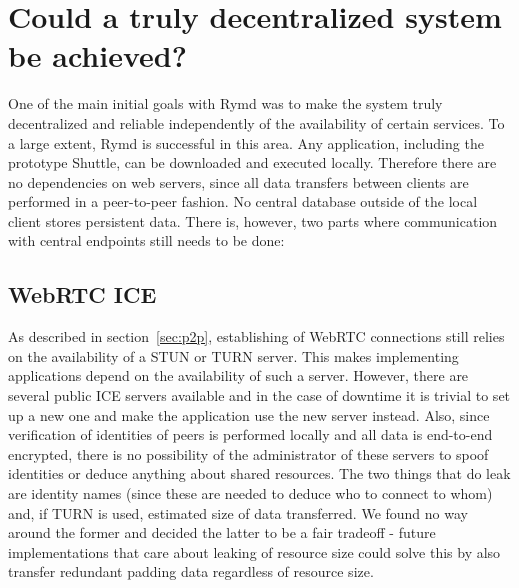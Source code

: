 \section{Could a truly decentralized system be achieved?}
One of the main initial goals with Rymd was to make the system truly decentralized and reliable independently of the availability of certain services. To a large extent, Rymd is successful in this area. Any application, including the prototype Shuttle, can be downloaded and executed locally. Therefore there are no dependencies on web servers, since all data transfers between clients are performed in a peer-to-peer fashion. No central database outside of the local client stores persistent data. There is, however, two parts where communication with central endpoints still needs to be done:

\subsection{WebRTC ICE}
As described in section~\ref{sec:p2p}, establishing of WebRTC connections still relies on the availability of a STUN or TURN server. This makes implementing applications depend on the availability of such a server. However, there are several public ICE servers available and in the case of downtime it is trivial to set up a new one and make the application use the new server instead. Also, since verification of identities of peers is performed locally and all data is end-to-end encrypted, there is no possibility of the administrator of these servers to spoof identities or deduce anything about shared resources. The two things that do leak are identity names (since these are needed to deduce who to connect to whom) and, if TURN is used, estimated size of data transferred. We found no way around the former and decided the latter to be a fair tradeoff - future implementations that care about leaking of resource size could solve this by also transfer redundant padding data regardless of resource size.

